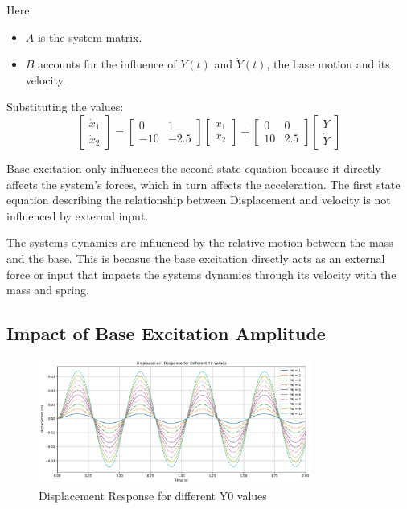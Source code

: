 \documentclass[12pt,a4paper]{article}
\begin{document}
Here:
\begin{itemize}
    \item \( A \) is the system matrix.
    \item \( B \) accounts for the influence of \( Y(t) \) and \( \dot{Y}(t) \), the base motion and its velocity.
\end{itemize}

Substituting the values:
\[
\begin{bmatrix}
\dot{x}_1 \\
\dot{x}_2
\end{bmatrix}
=
\begin{bmatrix}
0 & 1 \\
-10 & -2.5
\end{bmatrix}
\begin{bmatrix}
x_1 \\
x_2
\end{bmatrix}
+
\begin{bmatrix}
0 & 0 \\
10 & 2.5
\end{bmatrix}
\begin{bmatrix}
Y \\
\dot{Y}
\end{bmatrix}
\]

\vspace{5pt}

Base excitation only influences the second state equation because it directly affects the system's forces, which in turn affects the acceleration. The first state equation describing the relationship between Displacement and velocity is not influenced by external input.

The systems dynamics are influenced by the relative motion between the mass and the base. This is becasue the base excitation directly acts as an external force or input that impacts the systems dynamics through its velocity with the mass and spring. 



\subsection{Impact of Base Excitation Amplitude}
\begin{figure}[H]
    \centering
    \includegraphics[width=0.8\textwidth]{disp_response.png} 
    \caption{Displacement Response for different Y0 values}
    \label{fig:system}
\end{figure}
{\vspace{10pt}}
\end{document}
